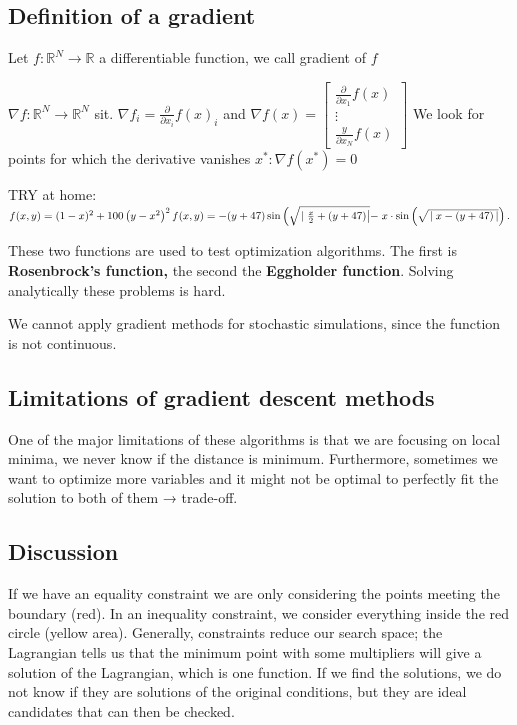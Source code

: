\hypertarget{definition-of-a-gradient}{%
\subsection{Definition of a
gradient}\label{definition-of-a-gradient}}

Let $f: \mathbb{R}^N \rightarrow \mathbb{R}$ a differentiable function,
we call gradient of $f$

$\nabla f: \mathbb{R}^N \rightarrow \mathbb{R}^N$ sit.
$\nabla f_i=\frac{\partial}{\partial x_i} f(x)_i$ and
$\nabla f(x) =\left[\begin{array}{c}\frac{\partial}{\partial x_1} f(x) \\ \vdots \\ \frac{y}{\partial x_N} f(x)\end{array}\right]$
We look for points for which the derivative vanishes
$x^* : \nabla f(x^*)=0$

TRY at
home:$f(x, y)=(1-x)^2+100\left(y-x^2\right)^2 \\ f(x, y)=-(y+47) \sin \left(\sqrt{\left.\mid \frac{x}{2}+(y+47)\right|}-\right. x \cdot \sin \left(\sqrt{\left.\mid x-(y+47\right)|}\right).$

These two functions are used to test optimization algorithms. The first
is \textbf{Rosenbrock's function,} the second the \textbf{Eggholder
function}. Solving analytically these problems is hard.

We cannot apply gradient methods for stochastic simulations, since the
function is not continuous.

\hypertarget{limitations-of-gradient-descent-methods}{%
\subsection{Limitations of gradient descent
methods}\label{limitations-of-gradient-descent-methods}}

One of the major limitations of these algorithms is that we are focusing
on local minima, we never know if the distance is minimum. Furthermore,
sometimes we want to optimize more variables and it might not be optimal
to perfectly fit the solution to both of them → trade-off.

\hypertarget{discussion}{%
\subsection{Discussion}\label{discussion}}

If we have an equality constraint we are only considering the points
meeting the boundary (red). In an inequality constraint, we consider
everything inside the red circle (yellow area). Generally, constraints
reduce our search space; the Lagrangian tells us that the minimum point
with some multipliers will give a solution of the Lagrangian, which is
one function. If we find the solutions, we do not know if they are
solutions of the original conditions, but they are ideal candidates that
can then be checked.

